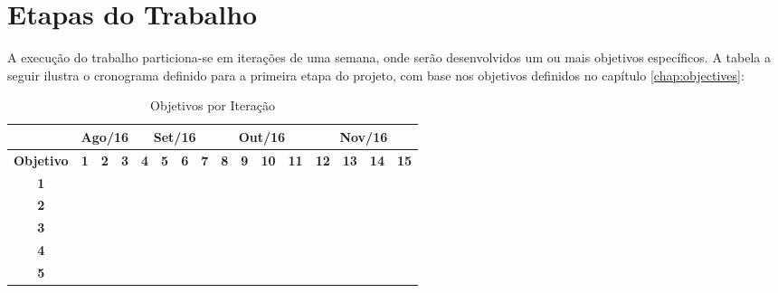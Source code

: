 \chapter{\label{chap:work-plan}Etapas do Trabalho}

A execução do trabalho particiona-se em iterações de uma semana, onde serão
desenvolvidos um ou mais objetivos específicos. A tabela a seguir ilustra o
cronograma definido para a primeira etapa do projeto, com base nos objetivos
definidos no capítulo \ref{chap:objectives}:

\begin{table}[htb!]
\centering
\caption{Objetivos por Iteração}
\label{tab:work-plan}
\begin{tabular}{c|c|c|c|c|c|c|c|c|c|c|c|c|c|c|c|}
\cline{2-16}
{\bf}                                 & \multicolumn{3}{c|}{{\bf Ago/16}} & \multicolumn{4}{c|}{{\bf Set/16}}     & \multicolumn{4}{c|}{{\bf Out/16}}      & \multicolumn{4}{c|}{{\bf Nov/16}}     \\ \hline
\multicolumn{1}{|c|}{{\bf Objetivo}}  & {\bf 1} & {\bf 2} & {\bf 3}	      & {\bf 4} & {\bf 5} & {\bf 6} & {\bf 7} & {\bf 8} & {\bf 9} & {\bf 10} & \bf{11} & \bf{12} & \bf{13} & \bf{14} & \bf{15} \\ \hline
\multicolumn{1}{|c|}{{\bf 1}}         &         &         &               &         &         &         &         &         &         &          &         &         &         &         &         \\ \hline
\multicolumn{1}{|c|}{{\bf 2}}         &         &         &               &         &         &         &         &         &         &          &         &         &         &         &         \\ \hline
\multicolumn{1}{|c|}{{\bf 3}}         &         &         &               &         &         &         &         &         &         &          &         &         &         &         &         \\ \hline
\multicolumn{1}{|c|}{{\bf 4}}         &         &         &               &         &         &         &         &         &         &          &         &         &         &         &         \\ \hline
\multicolumn{1}{|c|}{{\bf 5}}         &         &         &               &         &         &         &         &         &         &          &         &         &         &         &         \\ \hline
\end{tabular}
\end{table}

